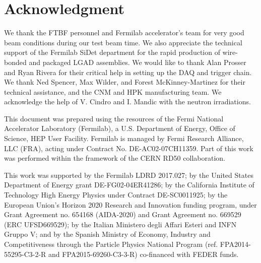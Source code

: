 \documentclass[preprint,1p]{elsarticle}
\begin{document}
\section*{Acknowledgment}

We thank the FTBF personnel and Fermilab accelerator's team for very good beam
conditions during our test beam time. We also appreciate the technical support
of the Fermilab SiDet department for the rapid production of wire-bonded and
packaged LGAD assemblies. We would like to thank Alan Prosser and Ryan Rivera
for their critical help in setting up the DAQ and trigger chain. We thank Ned
Spencer, Max Wilder, and Forest McKinney-Martinez for their technical
assistance, and the CNM and HPK manufacturing team. We acknowledge the help of
V. Cindro and I. Mandic with the neutron irradiations. 

This document was prepared using the resources of the Fermi National Accelerator
Laboratory (Fermilab), a U.S. Department of Energy, Office of Science, HEP User
Facility. Fermilab is managed by Fermi Research Alliance, LLC (FRA), acting
under Contract No. DE-AC02-07CH11359. Part of this work was performed within the
framework of the CERN RD50 collaboration.

This work was supported by the Fermilab LDRD 2017.027; by the United States
Department of Energy grant DE-FG02-04ER41286; by the California Institute of
Technology High Energy Physics under Contract DE-SC0011925; by the European
Union's Horizon 2020 Research and Innovation funding program, under Grant
Agreement no. 654168 (AIDA-2020) and Grant Agreement no. 669529 (ERC
UFSD669529); by the Italian Ministero degli Affari Esteri and INFN Gruppo V; and
by the Spanish Ministry of Economy, Industry and Competitiveness through the
Particle Physics National Program (ref. FPA2014-55295-C3-2-R and
FPA2015-69260-C3-3-R) co-financed with FEDER funds.









{}
 




\end{document}
